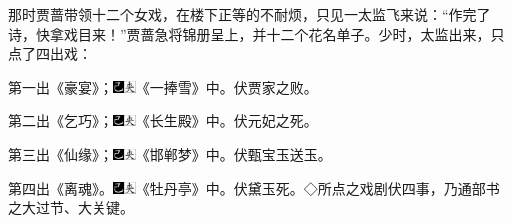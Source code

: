 那时贾蔷带领十二个女戏，在楼下正等的不耐烦，只见一太监飞来说：``作完了诗，快拿戏目来！''贾蔷急将锦册呈上，并十二个花名单子。少时，太监出来，只点了四出戏：

第一出《豪宴》；{\includegraphics[width=3mm]{../Images/00003}\includegraphics[width=3mm]{../Images/00012}\footnotesize \kaishu 《一捧雪》中。伏贾家之败。}

第二出《乞巧》；{\includegraphics[width=3mm]{../Images/00003}\includegraphics[width=3mm]{../Images/00012}\footnotesize \kaishu 《长生殿》中。伏元妃之死。}

第三出《仙缘》；{\includegraphics[width=3mm]{../Images/00003}\includegraphics[width=3mm]{../Images/00012}\footnotesize \kaishu 《邯郸梦》中。伏甄宝玉送玉。}

第四出《离魂》。{\includegraphics[width=3mm]{../Images/00003}\includegraphics[width=3mm]{../Images/00012}\footnotesize \kaishu 《牡丹亭》中。伏黛玉死。◇所点之戏剧伏四事，乃通部书之大过节、大关键。}


